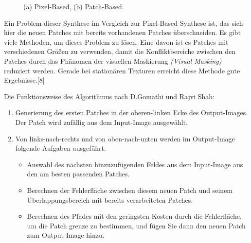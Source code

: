 \documentclass[12pt, a4paper,twoside,openright]{report}
\begin{document}
\begin{figure}[H]
    \centering
    \qquad
    \caption{(a) Pixel-Based, (b) Patch-Based.}%
\end{figure}

Ein Problem dieser Synthese im Vergleich zur Pixel-Based Synthese ist, das sich hier die neuen Patches mit bereits vorhandenen Patches überschneiden.
Es gibt viele Methoden, um dieses Problem zu lösen.
Eine davon ist es Patches mit verschiedenen Größen zu verwenden, damit die Konfliktbereiche zwischen den Patches durch das Phänomen der visuellen Maskierung
\textit{(Visual Masking)} reduziert werden.
Gerade bei stationären Texturen erreicht diese Methode gute Ergebnisse.{[8]}

Die Funktionsweise des Algorithmus nach D.Gomathi und Rajvi Shah:

\begin{enumerate}
    \item Generierung des ersten Patches in der oberen-linken Ecke des Output-Images. Der Patch wird zufällig aus dem Input-Image ausgewählt.
    \item Von links-nach-rechts und von oben-nach-unten werden im Output-Image folgende Aufgaben ausgeführt.
    \begin{itemize}
        \item Auswahl des nächsten hinzuzufügenden Feldes aus dem Input-Image aus den am besten passenden Patches.
        \item Berechnen der Fehlerfläche zwischen diesem neuen Patch und seinem Überlappungsbereich mit bereits
        verarbeiteten Patches.
        \item Berechnen des Pfades mit den geringsten Kosten durch die Fehlerfläche, um die Patch grenze zu bestimmen, und fügen Sie dann den neuen Patch zum Output-Image hinzu.
    \end{itemize}
\end{enumerate}
\end{document}
